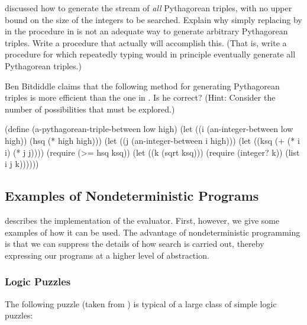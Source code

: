 \begin{exercise}
	\label{Exercise 4.36}
	 discussed how to generate the stream of \emph{all} Pythagorean triples, with no upper bound on the size of the integers to be searched.
	Explain why simply replacing  by  in the procedure in  is not an adequate way to generate arbitrary Pythagorean triples.
	Write a procedure that actually will accomplish this.
	(That is, write a procedure for which repeatedly typing  would in principle eventually generate all Pythagorean triples.)
\end{exercise}



\begin{exercise}
	\label{Exercise 4.37}
	Ben Bitdiddle claims that the following method for generating Pythagorean triples is more efficient than the one in .
	Is he correct?
	(Hint:
	Consider the number of possibilities that must be explored.)
	\begin{scheme}
	  (define (a-pythagorean-triple-between low high)
	    (let ((i (an-integer-between low high))
	          (hsq (* high high)))
	      (let ((j (an-integer-between i high)))
	        (let ((ksq (+ (* i i) (* j j))))
	          (require (>= hsq ksq))
	          (let ((k (sqrt ksq)))
	            (require (integer? k))
	            (list i j k))))))
	\end{scheme}
\end{exercise}



\subsection{Examples of Nondeterministic Programs}
\label{Section 4.3.2}

 describes the implementation of the  evaluator.
First, however, we give some examples of how it can be used.
The advantage of nondeterministic programming is that we can suppress the details of how search is carried out, thereby expressing our programs at a higher level of abstraction.



\subsubsection*{Logic Puzzles}

The following puzzle (taken from ) is typical of a large class of simple logic puzzles:

